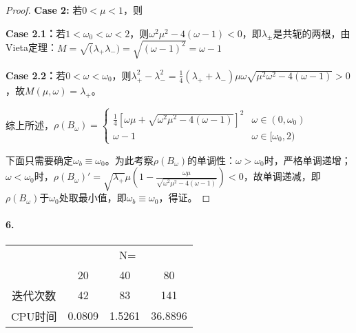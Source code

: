 \documentclass{ctexart}
\begin{document}
\begin{proof}
\textbf{Case 2: }若$0<\mu<1$，则

\textbf{Case 2.1：}若$1<\omega_0<\omega<2$，则$\omega^2\mu^2-4(\omega-1)<0$，即$\lambda_\pm$是共轭的两根，由Vieta定理：$M=\sqrt(\lambda_+\lambda_-)=\sqrt{(\omega-1)^2}=\omega-1$

\textbf{Case 2.2：}若$0<\omega<\omega_0$，则$\lambda_+^2-\lambda_-^2=\frac{1}{4}(\lambda_++\lambda_-)\mu\omega\sqrt{\mu^2\omega^2-4(\omega-1)}>0$，故$M(\mu,\omega)=\lambda_+$。

综上所述，$\rho(B_\omega)=\begin{cases}\frac{1}{4}[\omega\mu+\sqrt{\omega^2\mu^2-4(\omega-1)}]^2&\omega\in(0,\omega_0)\\\omega-1&\omega\in [\omega_0,2)\end{cases}$

下面只需要确定$\omega_b\equiv\omega_0$。为此考察$\rho(B_\omega)$的单调性：$\omega>\omega_0$时，严格单调递增；$\omega<\omega_0$时，$\rho(B_\omega)'=\sqrt{\lambda_+}\mu(1-\frac{\omega\mu}{\sqrt{\omega^2\mu^2-4(\omega-1)}})<0$，故单调递减，即$\rho(B_\omega)$于$\omega_0$处取最小值，即$\omega_b\equiv\omega_0$，得证。
\end{proof}


\paragraph{6.}


\begin{tabular}{cccc}
\toprule
& \multicolumn{3}{c}{N=} \\
\cmidrule{2-4}
& 20 & 40 & 80 \\
\midrule
迭代次数 & 42 & 83 & 141 \\
CPU时间 & 0.0809 & 1.5261& 36.8896 \\
\bottomrule
\end{tabular}
\end{document}
